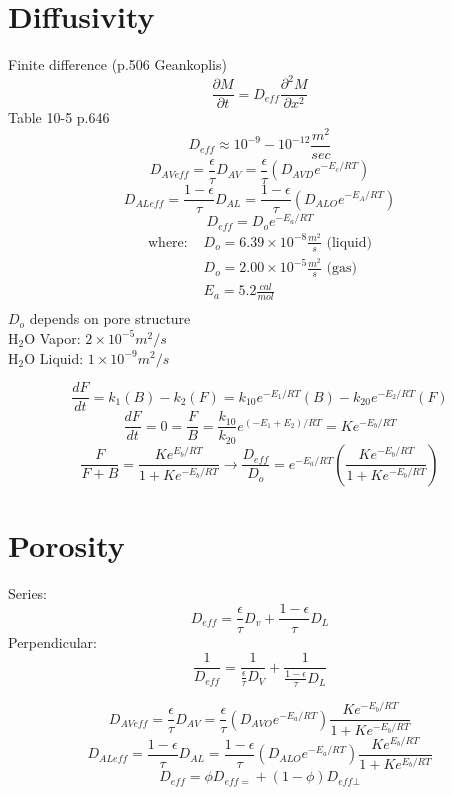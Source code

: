 \documentclass[11pt]{article}
\begin{document}
\section{Diffusivity}
Finite difference (p.506 Geankoplis)
\[ \frac{\partial M}{\partial t} = D_{eff} \frac{\partial^2 M}{\partial x^2} \]
Table 10-5 p.646
\[ D_{eff} \approx 10^{-9} - 10^{-12} \frac{m^2}{sec} \]
\[ D_{AVeff} = \frac{\epsilon}{\tau} D_{AV} = \frac{\epsilon}{\tau}(D_{AVD} e^{-E_c/RT}) \]
\[ D_{ALeff} = \frac{1-\epsilon}{\tau} D_{AL} = \frac{1-\epsilon}{\tau}(D_{ALO} e^{-E_A/RT}) \]
\[ D_{eff} = D_o e^{-E_a/RT} \]
\begin{align*}
\text{where: } & D_o = 6.39 \times 10^{-8} \frac{m^2}{s} \text{ (liquid)}\\
& D_o = 2.00 \times 10^{-5} \frac{m^2}{s} \text{ (gas)} \\
& E_a = 5.2 \frac{cal}{mol}\\
\end{align*}
$D_o$ depends on pore structure\\
H$_2$O Vapor: $2\times 10^{-5} m^2/s$\\
H$_2$O Liquid: $1\times 10^{-9} m^2/s$

\[ \frac{dF}{dt} = k_1(B) - k_2(F) = k_{10} e^{-E_1/RT}(B) - k_{20} e^{-E_2/RT}(F) \]
\[ \frac{dF}{dt} = 0 = \frac{F}{B} = \frac{k_{10}}{k_{20}} e^{(-E_1 + E_2)/RT} = Ke^{-E_b/RT} \]
\[ \frac{F}{F+B} = \frac{Ke^{E_b/RT}}{1+Ke^{-E_b/RT}} \rightarrow
\frac{D_{eff}}{D_o} = e^{-E_a/RT}\left(\frac{Ke^{-E_b/RT}}{1+Ke^{-E_b/RT}}\right) \]

\section{Porosity}
Series:
\[ D_{eff} = \frac{\epsilon}{\tau} D_v + \frac{1-\epsilon}{\tau} D_L \]
Perpendicular:
\[ \frac{1}{D_{eff}} = \frac{1}{\frac{\epsilon}{\tau}D_V} + \frac{1}{\frac{1-\epsilon}{\tau} D_L} \]

\[ D_{AVeff} = \frac{\epsilon}{\tau} D_{AV} = \frac{\epsilon}{\tau} (D_{AVO}e^{-E_a/RT}) \frac{Ke^{-E_b/RT}}{1+Ke^{-E_b/RT}} \]
\[ D_{ALeff} = \frac{1-\epsilon}{\tau} D_{AL} = \frac{1-\epsilon}{\tau} (D_{ALO} e^{-E_a/RT}) \frac{Ke^{E_b/RT}}{1+Ke^{E_b/RT}} \]
\[ D_{eff} = \phi D_{eff=} + (1-\phi) D_{eff\bot} \]
\end{document}
